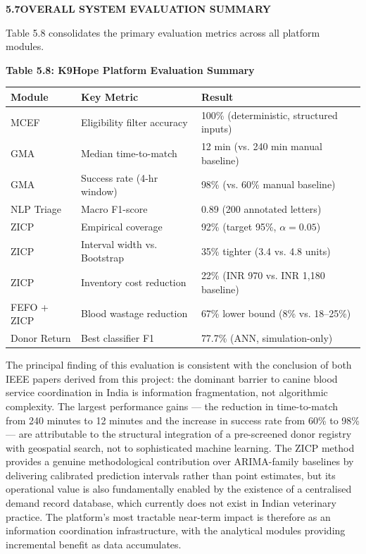 \documentclass[12pt,a4paper]{article}
\begin{document}
\vspace{1.5em}
\noindent\textbf{5.7\quad OVERALL SYSTEM EVALUATION SUMMARY}
\vspace{0.6em}

\noindent Table 5.8 consolidates the primary evaluation metrics across all platform modules.

\begin{center}
\textbf{Table 5.8: K9Hope Platform Evaluation Summary}
\vspace{0.4em}
\begin{tabular}{p{4cm} p{3.5cm} p{5.5cm}}
\toprule
\textbf{Module} & \textbf{Key Metric} & \textbf{Result} \\
\midrule
MCEF & Eligibility filter accuracy & 100\% (deterministic, structured inputs) \\
GMA & Median time-to-match & 12 min (vs. 240 min manual baseline) \\
GMA & Success rate (4-hr window) & 98\% (vs. 60\% manual baseline) \\
NLP Triage & Macro F1-score & 0.89 (200 annotated letters) \\
ZICP & Empirical coverage & 92\% (target 95\%, $\alpha = 0.05$) \\
ZICP & Interval width vs. Bootstrap & 35\% tighter (3.4 vs. 4.8 units) \\
ZICP & Inventory cost reduction & 22\% (INR 970 vs. INR 1,180 baseline) \\
FEFO + ZICP & Blood wastage reduction & 67\% lower bound (8\% vs. 18--25\%) \\
Donor Return & Best classifier F1 & 77.7\% (ANN, simulation-only) \\
\bottomrule
\end{tabular}
\end{center}

\noindent The principal finding of this evaluation is consistent with the conclusion of both IEEE papers derived from this project: the dominant barrier to canine blood service coordination in India is information fragmentation, not algorithmic complexity. The largest performance gains — the reduction in time-to-match from 240 minutes to 12 minutes and the increase in success rate from 60\% to 98\% — are attributable to the structural integration of a pre-screened donor registry with geospatial search, not to sophisticated machine learning. The ZICP method provides a genuine methodological contribution over ARIMA-family baselines by delivering calibrated prediction intervals rather than point estimates, but its operational value is also fundamentally enabled by the existence of a centralised demand record database, which currently does not exist in Indian veterinary practice. The platform's most tractable near-term impact is therefore as an information coordination infrastructure, with the analytical modules providing incremental benefit as data accumulates.
\end{document}

